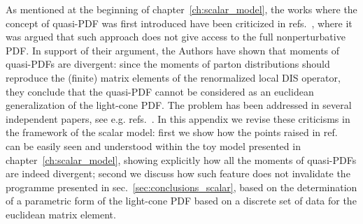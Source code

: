 As mentioned at the beginning of chapter~\ref{ch:scalar_model}, the works where the concept of
quasi-PDF was first introduced have been criticized in
refs.~\cite{Rossi:2017muf, Rossi:2018zkn}, where it was argued that such
approach does not give access to the full nonperturbative PDF. In support of
their argument, the Authors have shown that moments of quasi-PDFs are divergent:
since the moments of parton distributions should reproduce the (finite) matrix
elements of the renormalized local DIS operator, they conclude that the
quasi-PDF cannot be considered as an euclidean generalization of the light-cone
PDF. The problem has been addressed in several independent papers, see e.g.
refs.~\cite{Ji:2017rah, Radyushkin:2018nbf, Karpie:2018zaz}. In this appendix we
revise these criticisms in the framework of the scalar model: first we show how
the points raised in ref.~\cite{Rossi:2017muf, Rossi:2018zkn} can be easily seen
and understood within the toy model presented in chapter~\ref{ch:scalar_model}, showing explicitly
how all the moments of quasi-PDFs are indeed divergent; second we discuss how
such feature does not invalidate the programme presented in
sec.~\ref{sec:conclusions_scalar}, based on the determination of a parametric form of
the light-cone PDF based on a discrete set of data for the euclidean matrix
element.

